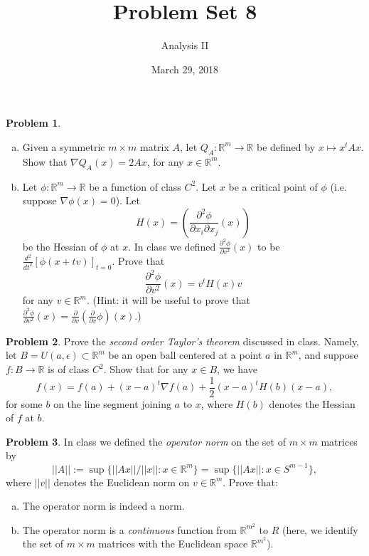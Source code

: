 \documentclass{amsart}
\newcommand{\+}[1]{\ensuremath{\mathbf{#1}}}
\newcommand{\R}{{\mathbb R}}
\theoremstyle{definition}
\newtheorem{prob}{Problem}
\begin{document}
\title{Problem Set 8}
\date{March 29, 2018}
\author{Analysis II}

\maketitle

\begin{prob}
 \begin{enumerate}[(a)]
 \item Given a symmetric $m \times m$ matrix $A$, let $Q_A: \R^m \to \R$ be defined by
 $x \mapsto x^t A x$.  Show that $\nabla Q_A (x) = 2 A x$, for any $x \in \R^m$.
  \item  Let $\phi: \R^m \to \R$ be a function of class $C^2$.
 Let $x$ be a critical point of $\phi$ (i.e. suppose $\nabla \phi (x) = 0$).
 Let \[H(x) = \left(\frac{\partial^2\phi}{\partial{x_i}\partial{x_j}}(x)\right)\] be the Hessian of $\phi$ at $x$.
 In class we defined $\frac{\partial^2\phi}{\partial v^2}(x)$ to be $\frac{d^2}{dt^2}[\phi(x+tv)]_{t=0}$.
 Prove that \[\frac{\partial^2\phi}{\partial v^2}(x) = v^t H(x) v\]
 for any $v \in \R^m$.
 (Hint: it will be useful to prove that $\frac{\partial^2\phi}{\partial v^2}(x) = \frac{\partial}{\partial v}(\frac{\partial}{\partial v}\phi)(x)$.)
 \end{enumerate}
\end{prob}

\begin{prob}
 Prove the \emph{second order Taylor's theorem} discussed in class.  Namely, let $B = U(a,\epsilon) \subset \R^m$
 be an open ball centered at a point $a$ in $\R^m$, and suppose
 $f: B \to \R$ is of class $C^2$.
 Show that for any $x \in B$, we have
 \[
 f(x) = f(a) + (x-a)^t \nabla f (a) + \frac{1}{2}(x-a)^t H(b) (x-a),
 \]
 for some $b$ on the line segment joining $a$ to $x$,
 where $H(b)$ denotes the Hessian of $f$ at $b$.
\end{prob}

\begin{prob}
 In class we defined the \emph{operator norm} on the set of $m \times m$ matrices by
 \[||A|| := \sup\{||Ax|| / ||x||: x \in \R^m\} = \sup\{||Ax||: x \in S^{m-1}\},\]
 where $||v||$ denotes the Euclidean norm on $v \in \R^m$.
 Prove that:
 \begin{enumerate}[(a)]
  \item The operator norm is indeed a norm.
  \item The operator norm is a \emph{continuous} function from 
  $\R^{m^2}$ to $R$ (here, we identify the set of $m \times m$ matrices with the Euclidean space $\R^{m^2}$).
 \end{enumerate}
\end{prob}
\end{document}
